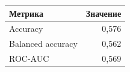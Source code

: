 \begin{center}
\begin{tabular}{lr}
\toprule
Метрика & Значение \\
\midrule
Accuracy & 0,576 \\
Balanced accuracy & 0,562 \\
ROC-AUC & 0,569 \\
\bottomrule
\end{tabular}
\end{center}
